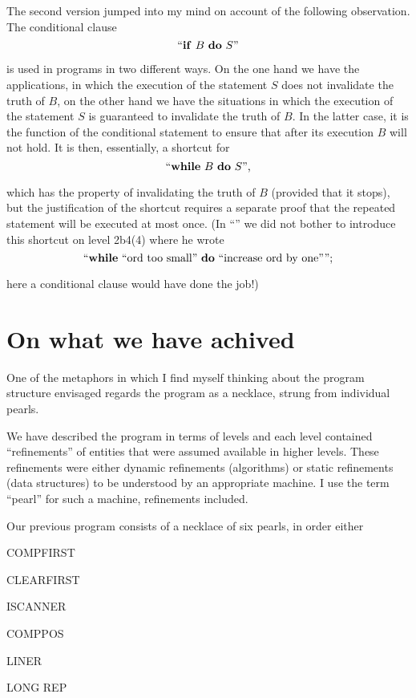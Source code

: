 The second version jumped into my mind on account of the following observation. The conditional clause
$$
\text{``\textbf{if} } B \text{ \textbf{do} } S\text{''}
$$

\noindent
is used in programs in two different ways. On the one hand we have the applications, in which the execution of the statement $S$ does not invalidate the truth of $B$, on the other hand we have the situations in which the execution of the statement $S$ is guaranteed to invalidate the truth of $B$. In the latter case, it is the function of the conditional statement to ensure that after its execution $B$ will not hold. It is then, essentially, a shortcut for
$$
\text{``\textbf{while} } B \text{ \textbf{do} } S\text{'',}
$$

\noindent
which has the property of invalidating the truth of $B$ (provided that it stops), but the justification of the shortcut requires a separate proof that the repeated statement will be executed at most once. (In ``'' we did not bother to introduce this shortcut on level 2b4(4) where he wrote
$$
\text{``\textbf{while} ``ord too small'' \textbf{do} ``increase ord by one'''';}
$$

\noindent
here a conditional clause would have done the job!)

\section{On what we have achived}

One of the metaphors in which I find myself thinking about the program structure envisaged regards the program as a necklace, strung from individual pearls.

We have described the program in terms of levels and each level contained ``refinements'' of entities that were assumed available in higher levels. These refinements were either dynamic refinements (algorithms) or static refinements (data structures) to be understood by an appropriate machine. I use the term ``pearl'' for such a machine, refinements included.

Our previous program consists of a necklace of six pearls, in order either

COMPFIRST

CLEARFIRST

ISCANNER

COMPPOS

LINER

LONG REP

